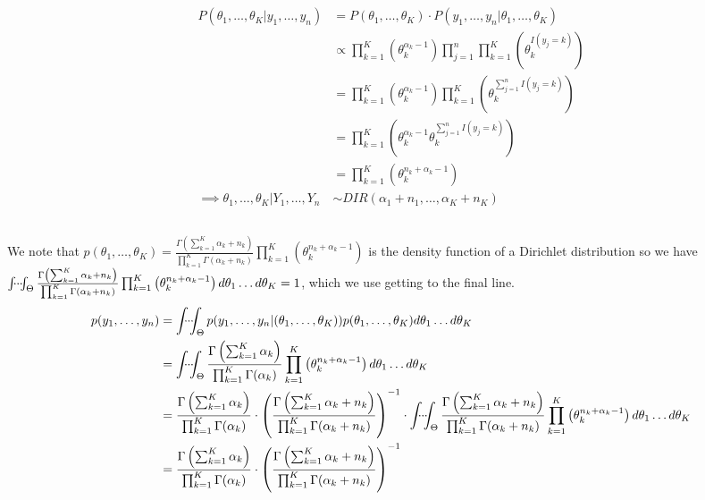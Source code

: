 \documentclass{article}\usepackage[]{graphicx}\usepackage[]{xcolor}
\begin{document}
\section{}
    \subsection{}
        \begin{align*}
            P(\theta_1,\dots,\theta_K|y_1,\dots,y_n)&=P(\theta_1,\dots,\theta_K)\cdot P(y_1,\dots,y_n|\theta_1,\dots,\theta_K)\\
            &\propto\prod_{k=1}^K\left(\theta_k^{\alpha_k-
            1}\right)\prod_{j=1}^n\prod_{k=1}^K\left(\theta_k^{I(y_j=k)}\right)\\
            &=\prod_{k=1}^K\left(\theta_k^{\alpha_k-1}\right)\prod_{k=1}^K\left(\theta_k^{\sum_{j=1}^nI(y_j=k)}\right)\\
            &=\prod_{k=1}^K\left(\theta_k^{\alpha_k-1}\theta_k^{\sum_{j=1}^nI(y_j=k)}\right)\\
            &=\prod_{k=1}^K\left(\theta_k^{n_k+\alpha_k-1}\right)\\
            \implies \theta_1,\dots,\theta_K|Y_1,\dots,Y_n&\sim DIR\left({\alpha_1+n_1},\dots, {\alpha_K+n_K}\right)
        \end{align*}
    \subsection{}
        We note that $p(\theta_1,\dots,\theta_K)=\frac{\Gamma\left(\sum^K_{k=1}\alpha_k+n_k\right)}{\prod^K_{k=1}\Gamma(\alpha_k+n_k)}\prod_{k=1}^K\left(\theta_k^{n_k+\alpha_k-1}\right)$ is the density function of a Dirichlet distribution so we have $\idotsint_\Theta\frac{\Gamma\left(\sum^K_{k=1}\alpha_k+n_k\right)}{\prod^K_{k=1}\Gamma(\alpha_k+n_k)}\prod_{k=1}^K\left(\theta_k^{n_k+\alpha_k-1}\right)d\theta_1\dots d\theta_K=1$, which we use getting to the final line.
        \begin{align*}
            p(y_1,\dots,y_n)&=\idotsint_\Theta p(y_1,\dots,y_n|(\theta_1,\dots,\theta_K))p(\theta_1,\dots,\theta_K)d\theta_1\dots d\theta_K\\
            &=\idotsint_\Theta\frac{\Gamma\left(\sum^K_{k=1}\alpha_k\right)}{\prod^K_{k=1}\Gamma(\alpha_k)}\prod_{k=1}^K\left(\theta_k^{n_k+\alpha_k-1}\right)d\theta_1\dots d\theta_K\\
            &=\frac{\Gamma\left(\sum^K_{k=1}\alpha_k\right)}{\prod^K_{k=1}\Gamma(\alpha_k)}\cdot\left(\frac{\Gamma\left(\sum^K_{k=1}\alpha_k+n_k\right)}{\prod^K_{k=1}\Gamma(\alpha_k+n_k)}\right)^{-1}\cdot\idotsint_\Theta\frac{\Gamma\left(\sum^K_{k=1}\alpha_k+n_k\right)}{\prod^K_{k=1}\Gamma(\alpha_k+n_k)}\prod_{k=1}^K\left(\theta_k^{n_k+\alpha_k-1}\right)d\theta_1\dots d\theta_K\\
            &=\frac{\Gamma\left(\sum^K_{k=1}\alpha_k\right)}{\prod^K_{k=1}\Gamma(\alpha_k)}\cdot\left(\frac{\Gamma\left(\sum^K_{k=1}\alpha_k+n_k\right)}{\prod^K_{k=1}\Gamma(\alpha_k+n_k)}\right)^{-1}
        \end{align*}
\end{document}
